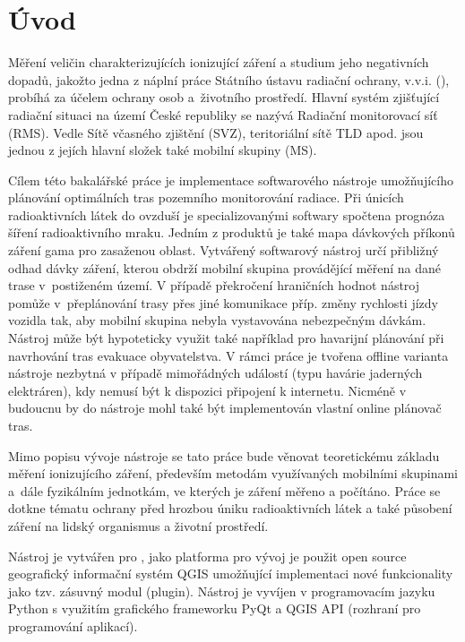 \chapter{Úvod}
\label{1-uvod}
Měření veličin charakterizujících ionizující záření a studium jeho negativních dopadů, jakožto jedna z náplní práce Státního ústavu radiační ochrany, v.v.i. (), probíhá za účelem ochrany osob a~životního prostředí. %
Hlavní systém zjišťující radiační situaci na území České republiky se nazývá Radiační monitorovací síť (RMS). Vedle Sítě včasného zjištění (SVZ), teritoriální sítě TLD apod. jsou jednou z jejích hlavní složek také mobilní skupiny (MS).

Cílem této bakalářské práce je implementace softwarového nástroje umožňujícího plánování optimálních tras pozemního monitorování radiace. Při únicích radioaktivních látek do ovzduší je specializovanými softwary spočtena prognóza šíření radioaktivního mraku. Jedním z produktů je také mapa dávkových příkonů záření gama pro zasaženou oblast. Vytvářený softwarový nástroj určí přibližný odhad dávky záření, kterou obdrží mobilní skupina provádějící měření na dané trase v~postiženém území. V případě překročení hraničních hodnot nástroj pomůže v~přeplánování trasy přes jiné komunikace příp. změny rychlosti jízdy vozidla tak, aby mobilní skupina nebyla vystavována nebezpečným dávkám. 
Nástroj může být hypoteticky využit také například pro havarijní plánování při navrhování tras evakuace obyvatelstva. V rámci práce je tvořena offline varianta nástroje nezbytná v případě mimořádných událostí (typu havárie jaderných elektráren), kdy nemusí být k dispozici připojení k internetu. Nicméně v budoucnu by do nástroje mohl také být implementován vlastní online plánovač tras. 

Mimo popisu vývoje nástroje se tato práce bude věnovat teoretickému základu měření ionizujícího záření, především metodám využívaných mobilními skupinami a~dále fyzikálním jednotkám, ve kterých je záření měřeno a počítáno. Práce se  dotkne tématu ochrany před hrozbou úniku radioaktivních látek a také působení záření na lidský organismus a životní prostředí.

Nástroj je vytvářen pro , jako platforma pro vývoj je použit open source geografický informační systém QGIS umožňující implementaci nové funkcionality jako tzv. zásuvný modul (plugin). Nástroj je vyvíjen v programovacím jazyku Python s využitím grafického frameworku PyQt a QGIS API (rozhraní pro programování aplikací).    






